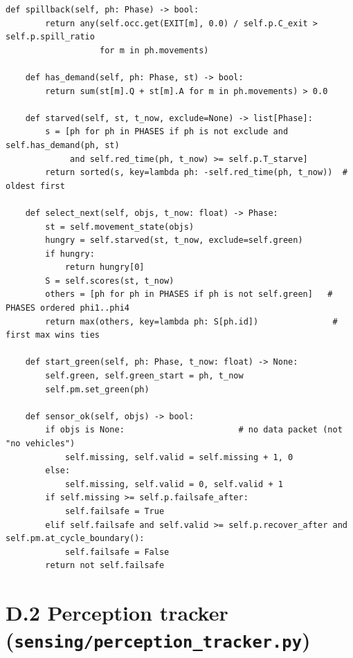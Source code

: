 \begin{lstlisting}[style=py,caption={\texttt{PrismController}: state, phase selection and fail-safe},label={lst:app-prism}]
    def spillback(self, ph: Phase) -> bool:
        return any(self.occ.get(EXIT[m], 0.0) / self.p.C_exit > self.p.spill_ratio
                   for m in ph.movements)

    def has_demand(self, ph: Phase, st) -> bool:
        return sum(st[m].Q + st[m].A for m in ph.movements) > 0.0

    def starved(self, st, t_now, exclude=None) -> list[Phase]:
        s = [ph for ph in PHASES if ph is not exclude and self.has_demand(ph, st)
             and self.red_time(ph, t_now) >= self.p.T_starve]
        return sorted(s, key=lambda ph: -self.red_time(ph, t_now))  # oldest first

    def select_next(self, objs, t_now: float) -> Phase:
        st = self.movement_state(objs)
        hungry = self.starved(st, t_now, exclude=self.green)
        if hungry:
            return hungry[0]
        S = self.scores(st, t_now)
        others = [ph for ph in PHASES if ph is not self.green]   # PHASES ordered phi1..phi4
        return max(others, key=lambda ph: S[ph.id])               # first max wins ties

    def start_green(self, ph: Phase, t_now: float) -> None:
        self.green, self.green_start = ph, t_now
        self.pm.set_green(ph)

    def sensor_ok(self, objs) -> bool:
        if objs is None:                       # no data packet (not "no vehicles")
            self.missing, self.valid = self.missing + 1, 0
        else:
            self.missing, self.valid = 0, self.valid + 1
        if self.missing >= self.p.failsafe_after:
            self.failsafe = True
        elif self.failsafe and self.valid >= self.p.recover_after and self.pm.at_cycle_boundary():
            self.failsafe = False
        return not self.failsafe
\end{lstlisting}

\section*{D.2 Perception tracker (\texttt{sensing/perception\_tracker.py})}

